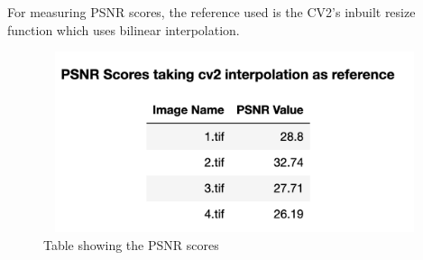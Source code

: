 \documentclass{article}
\begin{document}
	For measuring PSNR scores, the reference used is the CV2's inbuilt resize function which uses bilinear interpolation. 
	 
	\begin{figure}[H]
		\centering
		\vspace{0pt}
		\includegraphics[width=400pt, height = 150pt, keepaspectratio]{./psnr_scores.png}
		\caption{Table showing the PSNR scores}
	\end{figure}
	
\end{document}

